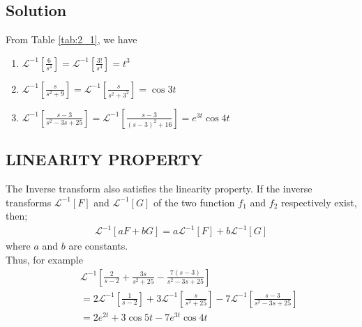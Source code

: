 \documentclass[11pt]{report}
\newcommand{\Laplace}{\mathcal{L}}
\newcommand{\InverseL}[1]{\Laplace^{-1}\left[#1\right]}
\newcommand{\sps}{\\[0.2cm]}
\newcommand{\dsp}{\displaystyle}
\begin{document}
	\subsection*{Solution}
	From Table \ref{tab:2_1}, we have
	\begin{enumerate}
		\item $\dsp \InverseL{\frac{6}{s^4}} =  \InverseL{\frac{3!}{s^4}} = t^3$\sps
		\item $\dsp \InverseL{\frac{s}{s^2+9}} = \InverseL{\frac{s}{s^2 + 3^2}} = \cos 3t$\sps
		\item $\dsp\InverseL{\frac{s-3}{s^2-3s+25}} = \InverseL{\frac{s-3}{(s-3)^2 + 16}} = e^{3t}\cos 4t$
	\end{enumerate}
	
	\subsection{LINEARITY PROPERTY}
	The Inverse transform also satisfies the linearity property. If the inverse transforms $\dsp \InverseL{F}$ and $\dsp\InverseL{G}$ of the two function $f_1$ and $f_2$ respectively exist, then;
	\begin{eqnarray*}
		\InverseL{aF + bG} = a\InverseL{F} + b\InverseL{G}
	\end{eqnarray*}
	where $a$ and $b$ are constants.\\
	Thus, for example
	\begin{eqnarray*}
		&&\InverseL{\frac{2}{s-2} + \frac{3s}{s^2+25} - \frac{7(s-3)}{s^2-3s+25}}\sps
		&&= 2\InverseL{\frac{1}{s-2}} + 3\InverseL{\frac{s}{s^2+25}} - 7\InverseL{\frac{s-3}{s^2-3s+25}}\sps
		&&=2e^{2t} + 3\cos 5t - 7e^{3t}\cos 4t
	\end{eqnarray*}
	
\end{document}

